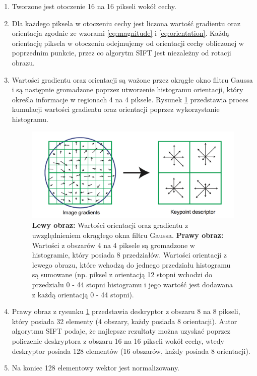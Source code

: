 \begin{enumerate}
\item Tworzone jest otoczenie 16 na 16 pikseli wokół cechy.
\item Dla każdego piksela w otoczeniu cechy jest liczona wartość gradientu oraz orientacja zgodnie ze wzorami \ref{eq:magnitude} i \ref{eq:orientation}. Każdą orientację piksela w otoczeniu odejmujemy od orientacji cechy obliczonej w poprzednim punkcie, przez co algorytm SIFT jest niezależny od rotacji obrazu.
\item Wartości gradientu oraz orientacji są ważone przez okrągłe okno filtru Gaussa i są następnie gromadzone poprzez utworzenie histogramu orientacji, który określa informacje w regionach 4 na 4 piksele. Rysunek \ref{fig:proponowane_algorytmy:descriptor} przedstawia proces kumulacji wartości gradientu oraz orientacji poprzez wykorzystanie histogramu.
\begin{figure}[H]
  \centering
  \includegraphics[width=\textwidth]{gfx/descriptor}
  \caption{\cite{Lowe:2004:DIF:993451.996342} \textbf{Lewy obraz:} Wartości orientacji oraz gradientu z uwzględnieniem okrągłego okna filtru Gaussa. \textbf{Prawy obraz:} Wartości z obszarów 4 na 4 piksele są gromadzone w histogramie, który posiada 8 przedziałów. Wartości orientacji z lewego obrazu, które wchodzą do jednego przedziału histogramu są sumowane (np. piksel z orientacją 12 stopni wchodzi do przedziału 0 - 44 stopni histogramu i jego wartość jest dodawana z każdą orientacją 0 - 44 stopni).}
  \label{fig:proponowane_algorytmy:descriptor}
\end{figure}
\item Prawy obraz z rysunku \ref{fig:proponowane_algorytmy:descriptor} przedstawia deskryptor z obszaru 8 na 8 pikseli, który posiada 32 elementy (4 obszary, każdy posiada 8 orientacji). Autor algorytmu SIFT podaje, że najlepsze rezultaty można uzyskać poprzez policzenie deskryptora z obszaru 16 na 16 pikseli wokół cechy, wtedy deskryptor posiada 128 elementów (16 obszarów, każdy posiada 8 orientacji).
\item Na koniec 128 elementowy wektor jest normalizowany.
\end{enumerate}

